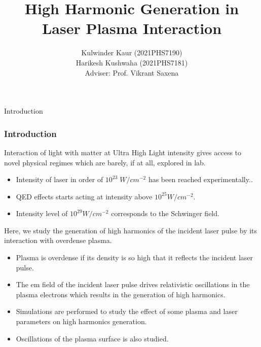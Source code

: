 \documentclass{beamer}
\title[High Harmonic Generation]{High Harmonic Generation in Laser Plasma Interaction}
\date{}
\institute[IIT Delhi]{\large Indian Institute of Technology, Delhi}
\author[]{Kulwinder Kaur (2021PHS7190)\\ Harikesh Kushwaha (2021PHS7181)\\[3mm]Adviser: Prof. Vikrant Saxena}
\begin{document}
\maketitle
\begin{frame}{Introduction}
    \frametitle{Introduction}
    \small
    Interaction of light with matter at Ultra High Light intensity gives access to novel physical regimes which are barely, if at all, explored in lab.\cite{henri}\footnotemark
    \begin{itemize}
        \item Intensity of laser in order of $10^{23} \; W/cm^{-2}$ has been reached experimentally.\cite{highintensity}\footnotemark.
        \item QED effects starts acting at intensity above $10^{25}W/cm^{-2}$.
        \item Intensity level of $10^{29}W/cm^{-2}$ corresponds to the Schwinger field.
    \end{itemize}
    Here, we study the generation of high harmonics of the incident laser pulse by its interaction with overdense plasma.

    \begin{itemize}
        \item Plasma is overdense if its density is so high that it reflects the incident laser pulse.
        \item The em field of the incident laser pulse drives relativistic oscillations in the plasma electrons which results in the generation of high harmonics.
        \item Simulations are performed to study the effect of some plasma and laser parameters on high harmonics generation.
        \item Oscillations of the plasma surface is also studied.
    \end{itemize}

\end{frame}
\end{document}
